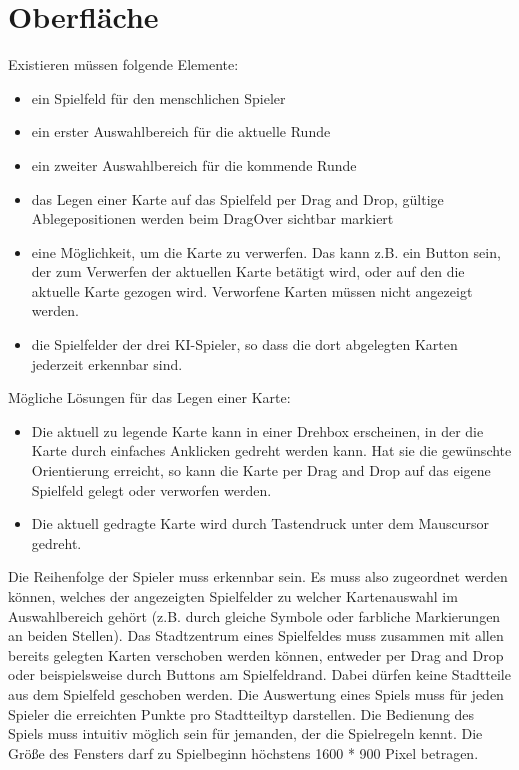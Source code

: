 \section{Oberfläche}
Existieren müssen folgende Elemente:
\begin{itemize}
	\item ein Spielfeld für den menschlichen Spieler
	\item ein erster Auswahlbereich für die aktuelle Runde
	\item ein zweiter Auswahlbereich für die kommende Runde
	\item das Legen einer Karte auf das Spielfeld per Drag and Drop, gültige Ablegepositionen werden beim DragOver sichtbar markiert
	\item eine Möglichkeit, um die Karte zu verwerfen. Das kann z.B. ein Button sein, der zum Verwerfen der aktuellen 	Karte betätigt wird, oder auf den die aktuelle Karte gezogen wird. Verworfene Karten müssen nicht angezeigt werden.
	\item die Spielfelder der drei KI-Spieler, so dass die dort abgelegten Karten jederzeit erkennbar sind.
\end{itemize}
Mögliche Lösungen für das Legen einer Karte:
\begin{itemize}
	\item Die aktuell zu legende Karte kann in einer Drehbox erscheinen, in der die Karte durch einfaches Anklicken gedreht werden kann. Hat sie die gewünschte Orientierung erreicht, so kann die Karte per Drag and Drop auf das eigene Spielfeld gelegt oder verworfen werden.
	\item Die aktuell gedragte Karte wird durch Tastendruck unter dem Mauscursor gedreht.
\end{itemize}
Die Reihenfolge der Spieler muss erkennbar sein. Es muss also zugeordnet werden können, welches der angezeigten Spielfelder zu welcher Kartenauswahl im Auswahlbereich gehört (z.B. durch gleiche Symbole oder farbliche Markierungen an beiden Stellen).
Das Stadtzentrum eines Spielfeldes muss zusammen mit allen bereits gelegten Karten verschoben werden können, entweder per Drag and Drop oder beispielsweise durch Buttons am Spielfeldrand. Dabei dürfen keine Stadtteile aus dem Spielfeld geschoben werden.
Die Auswertung eines Spiels muss für jeden Spieler die erreichten Punkte pro Stadtteiltyp darstellen.
Die Bedienung des Spiels muss intuitiv möglich sein für jemanden, der die Spielregeln kennt.
Die Größe des Fensters darf zu Spielbeginn höchstens 1600 * 900 Pixel betragen.


